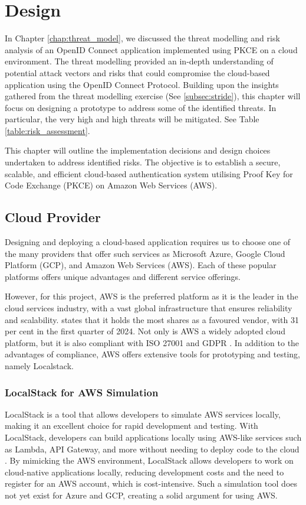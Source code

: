 \chapter{Design}

In Chapter \ref{chap:threat_model}, we discussed the threat modelling and risk analysis of an OpenID Connect application implemented using PKCE on a cloud environment. The threat modelling provided an in-depth understanding of potential attack vectors and risks that could compromise the cloud-based application using the OpenID Connect Protocol. Building upon the insights gathered from the threat modelling exercise (See \ref{subsec:stride}), this chapter will focus on designing a prototype to address some of the identified threats. In particular, the very high and high threats will be mitigated. See Table \ref{table:risk_assessment}. 

This chapter will outline the implementation decisions and design choices undertaken to address identified risks. The objective is to establish a secure, scalable, and efficient cloud-based authentication system utilising Proof Key for Code Exchange (PKCE) on Amazon Web Services (AWS).

\section{Cloud Provider}
\label{sec:cloud_provider}
Designing and deploying a cloud-based application requires us to choose one of the many providers that offer such services as Microsoft Azure, Google Cloud Platform (GCP), and Amazon Web Services (AWS). Each of these popular platforms offers unique advantages and different service offerings. 

However, for this project, AWS is the preferred platform as it is the leader in the cloud services industry, with a vast global infrastructure that ensures reliability and scalability. \cite{aws_leader} states that it holds the most shares as a favoured vendor, with 31 per cent in the first quarter of 2024. Not only is AWS a widely adopted cloud platform, but it is also compliant with ISO 27001 and GDPR \citep{aws_iso}. In addition to the advantages of compliance, AWS offers extensive tools for prototyping and testing, namely Localstack.

\subsection{LocalStack for AWS Simulation}
LocalStack is a tool that allows developers to simulate AWS services locally, making it an excellent choice for rapid development and testing. With LocalStack, developers can build applications locally using AWS-like services such as Lambda, API Gateway, and more without needing to deploy code to the cloud \citep{localstack}. By mimicking the AWS environment, LocalStack allows developers to work on cloud-native applications locally, reducing development costs and the need to register for an AWS account, which is cost-intensive. Such a simulation tool does not yet exist for Azure and GCP, creating a solid argument for using AWS.


